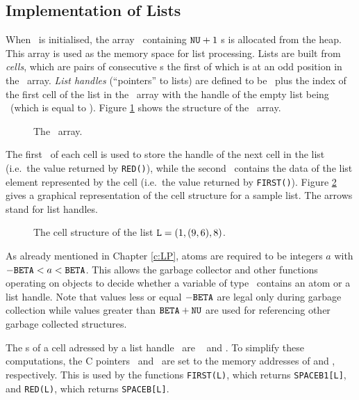 \subsection{Implementation of Lists}

When \saclib\ is initialised, the array \SPACE\ containing ${\tt NU}+1$ \Word s is
allocated from the heap. This array is used as the memory space for list
processing. Lists are built from {\em cells}, which are pairs of
consecutive \Word s the first of which is at an odd position in the \SPACE\
array. {\em List handles} (``pointers'' to lists) are defined to be \BETA\
plus the index of the first cell of the list in the \SPACE\ array with the
handle of the empty list being \NIL\ (which is equal to \BETA). Figure
\ref{f:SPACE} shows the structure of the \SPACE\ array.

\begin{figure}[htb]

\caption{The \SPACE\ array.}
\label{f:SPACE}
\end{figure}

The first \Word\ of each cell is used to store the handle of the next cell
in the list (i.e.\ the value returned by {\tt RED()}), while the second
\Word\ contains the data of the list element represented by the cell (i.e.\ 
the value returned by {\tt FIRST()}). Figure \ref{f:LIST} gives a graphical
representation of the cell structure for a sample list. The arrows stand
for list handles.

\begin{figure}[htb]

\caption{The cell structure of the list ${\tt L} = (1,(9,6),8)$.}
\label{f:LIST}
\end{figure}

As already mentioned in Chapter \ref{c:LP}, atoms are required to be
integers $a$ with $-{\tt BETA} < a < {\tt BETA}$. This allows the garbage collector
and other functions operating on objects to decide whether a variable of
type \Word\ contains an atom or a list handle. Note that values less or
equal $-\BETA$ are legal only during garbage collection while values
greater than ${\tt BETA} + {\tt NU}$ are used for referencing other garbage collected
structures.

The \Word s of a cell adressed by a list handle \ttL\ are {\tt
\SPACE[$\ttL-\BETA$]} and {\tt {}}. To simplify these
computations, the C pointers \SPACEB\ and \SPACEBone\ are set to the memory
addresses of {\tt \SPACE[$-\BETA$]} and {\tt \SPACE[$-\BETA+1$]},
respectively. This is used by the functions {\tt FIRST(L)}, which returns
{\tt SPACEB1[L]}, and {\tt RED(L)}, which returns {\tt SPACEB[L]}.



